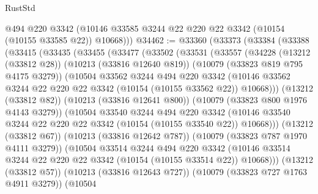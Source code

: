\begin{lexlean}{RustStd}
\begin{coremodule}
{\begin{coremodule}
{{{{{{{{{{{{{{{{{{{{{{{{{{        @494
        @220
        @3342
        (@10146 @33585 @3244 @22 @220 @22 @3342 (@10154 (@10155 @33585 @22)) @10668)))
@34462 := @33360
    (@33373
      (@33384
        (@33388
          (@33415
            (@33435
              (@33455
                (@33477
                  (@33502
                    (@33531
                      (@33557
                        (@34228
                          (@13212 (@33812 @28))
                          (@10213 (@33816 @12640 @819))
                          (@10079 (@33823 @819 @795 @4175 @3279))
                          (@10504
                            @33562
                            @3244
                            @494
                            @220
                            @3342
                            (@10146
                              @33562
                              @3244
                              @22
                              @220
                              @22
                              @3342
                              (@10154 (@10155 @33562 @22))
                              @10668)))
                        (@13212 (@33812 @82))
                        (@10213 (@33816 @12641 @800))
                        (@10079 (@33823 @800 @1976 @4143 @3279))
                        (@10504
                          @33540
                          @3244
                          @494
                          @220
                          @3342
                          (@10146
                            @33540
                            @3244
                            @22
                            @220
                            @22
                            @3342
                            (@10154 (@10155 @33540 @22))
                            @10668)))
                      (@13212 (@33812 @67))
                      (@10213 (@33816 @12642 @787))
                      (@10079 (@33823 @787 @1970 @4111 @3279))
                      (@10504
                        @33514
                        @3244
                        @494
                        @220
                        @3342
                        (@10146
                          @33514
                          @3244
                          @22
                          @220
                          @22
                          @3342
                          (@10154 (@10155 @33514 @22))
                          @10668)))
                    (@13212 (@33812 @57))
                    (@10213 (@33816 @12643 @727))
                    (@10079 (@33823 @727 @1763 @4911 @3279))
                    (@10504
}}}}}}}}}}}}}}}}}}}}}}}}}}
\end{coremodule}}
\end{coremodule}
\end{lexlean}
